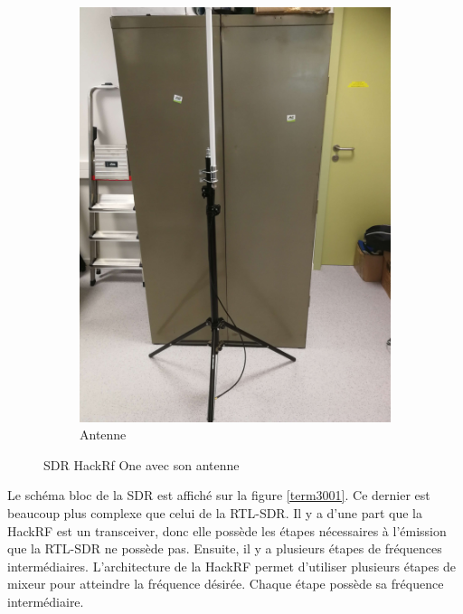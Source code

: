 \begin{figure}[h]
\begin{subfigure}{0.4\textwidth}
\end{subfigure}
\hspace{0.5cm} %
\begin{subfigure}{0.4\textwidth}
  \centering
  \includegraphics[width=\textwidth]{images/pied.png}
  \caption{Antenne}
  \label{term340}
\end{subfigure}
\caption{SDR HackRf One avec son antenne}
\label{bothimages}
\end{figure}


Le schéma bloc de la \ac{SDR} est affiché sur la figure \ref{term3001}. Ce dernier est beaucoup plus complexe que celui de la RTL-SDR. Il y a d'une part que la HackRF est un transceiver, donc elle possède les étapes nécessaires à l'émission que la RTL-SDR ne possède pas. Ensuite, il y a plusieurs étapes de fréquences intermédiaires. L'architecture de la HackRF \footnotemark[10] permet d'utiliser plusieurs étapes de mixeur pour atteindre la fréquence désirée. Chaque étape possède sa fréquence intermédiaire.

